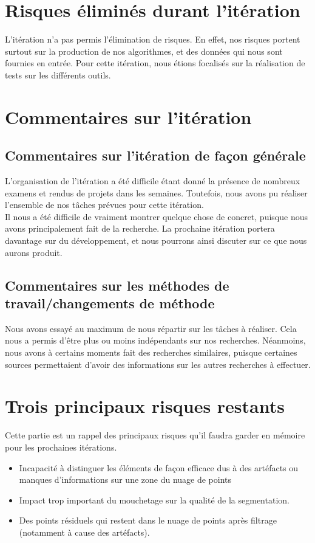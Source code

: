 \documentclass[12pt,titlepage,french]{article}
\begin{document}
\section{Risques éliminés durant l'itération}
L'itération n'a pas permis l'élimination de risques. En effet, nos risques portent surtout sur la production de nos algorithmes, et des données qui nous sont fournies en entrée. Pour cette itération, nous étions focalisés sur la réalisation de tests sur les différents outils.

\section{Commentaires sur l'itération}

\subsection{Commentaires sur l'itération de façon générale}
L'organisation de l'itération a été difficile étant donné la présence de nombreux examens et rendus de projets dans les semaines. Toutefois, nous avons pu réaliser l'ensemble de nos tâches prévues pour cette itération.\\
Il nous a été difficile de vraiment montrer quelque chose de concret, puisque nous avons principalement fait de la recherche. La prochaine itération portera davantage sur du développement, et nous pourrons ainsi discuter sur ce que nous aurons produit.

\subsection{Commentaires sur les méthodes de travail/changements de méthode}
Nous avons essayé au maximum de nous répartir sur les tâches à réaliser. Cela nous a permis d'être plus ou moins indépendants sur nos recherches. Néanmoins, nous avons à certains moments fait des recherches similaires, puisque certaines sources permettaient d'avoir des informations sur les autres recherches à effectuer.

\section{Trois principaux risques restants}
Cette partie est un rappel des principaux risques qu'il faudra garder en mémoire pour les prochaines itérations.

\begin{itemize}
  \item Incapacité à distinguer les éléments de façon efficace dus à des artéfacts ou manques d'informations sur une zone du nuage de points
  \item Impact trop important du mouchetage sur la qualité de la segmentation.
  \item Des points résiduels qui restent dans le nuage de points après filtrage (notamment à cause des artéfacts).  
\end{itemize}
\end{document}
